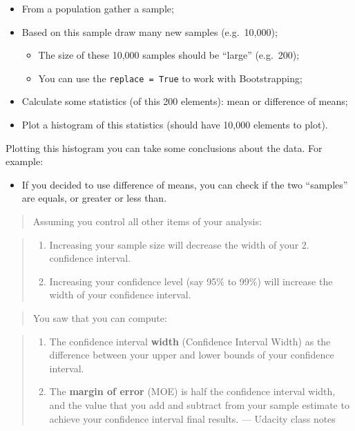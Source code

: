 \documentclass[]{book}
\providecommand{\tightlist}{%
  \setlength{\itemsep}{0pt}\setlength{\parskip}{0pt}}
\begin{document}
\begin{itemize}
\tightlist
\item
  From a population gather a sample;
\item
  Based on this sample draw many new samples (e.g.~10,000);

  \begin{itemize}
  \tightlist
  \item
    The size of these 10,000 samples should be ``large'' (e.g.~200);
  \item
    You can use the \texttt{replace\ =\ True} to work with
    Bootstrapping;
  \end{itemize}
\item
  Calculate some statistics (of this 200 elements): mean or difference
  of means;
\item
  Plot a histogram of this statistics (should have 10,000 elements to
  plot).
\end{itemize}

Plotting this histogram you can take some conclusions about the data.
For example:

\begin{itemize}
\tightlist
\item
  If you decided to use difference of means, you can check if the two
  ``samples'' are equals, or greater or less than.
\end{itemize}

\begin{quote}
Assuming you control all other items of your analysis:
\end{quote}

\begin{quote}
\begin{enumerate}
\def\labelenumi{\arabic{enumi}.}
\tightlist
\item
  Increasing your sample size will decrease the width of your 2.
  confidence interval.
\item
  Increasing your confidence level (say 95\% to 99\%) will increase the
  width of your confidence interval.
\end{enumerate}
\end{quote}

\begin{quote}
You saw that you can compute:
\end{quote}

\begin{quote}
\begin{enumerate}
\def\labelenumi{\arabic{enumi}.}
\tightlist
\item
  The confidence interval \textbf{width} (Confidence Interval Width) as
  the difference between your upper and lower bounds of your confidence
  interval.
\item
  The \textbf{margin of error} (MOE) is half the confidence interval
  width, and the value that you add and subtract from your sample
  estimate to achieve your confidence interval final results. ---
  Udacity class notes
\end{enumerate}
\end{quote}
\end{document}
